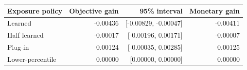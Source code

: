 \begin{tabular}{lrrr}
\toprule
Exposure policy & Objective gain & 95\% interval & Monetary gain \\
\midrule
Learned & -0.00436 & [-0.00829, -0.00047] & -0.00411 \\
Half learned & -0.00017 & [-0.00196, 0.00171] & -0.00007 \\
Plug-in & 0.00124 & [-0.00035, 0.00285] & 0.00125 \\
Lower-percentile & 0.00000 & [0.00000, 0.00000] & 0.00000 \\
\bottomrule
\end{tabular}
